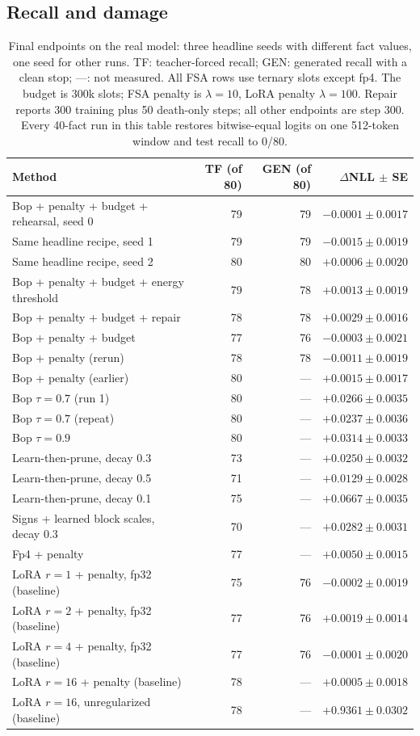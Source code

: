 \documentclass[11pt]{article}
\begin{document}
\subsection{Recall and damage}
\begin{table}[!ht]\centering\small
\setlength{\tabcolsep}{3pt}
\begin{tabular}{lrrr}\toprule
Method & TF (of 80) & GEN (of 80) & $\Delta$NLL $\pm$ SE\\\midrule
Bop + penalty + budget + rehearsal, seed 0 & 79 & 79 & $-0.0001\pm0.0017$\\
Same headline recipe, seed 1 & 79 & 79 & $-0.0015\pm0.0019$\\
Same headline recipe, seed 2 & 80 & 80 & $+0.0006\pm0.0020$\\
Bop + penalty + budget + energy threshold & 79 & 78 & $+0.0013\pm0.0019$\\
Bop + penalty + budget + repair & 78 & 78 & $+0.0029\pm0.0016$\\
Bop + penalty + budget & 77 & 76 & $-0.0003\pm0.0021$\\
Bop + penalty (rerun) & 78 & 78 & $-0.0011\pm0.0019$\\
Bop + penalty (earlier) & 80 & --- & $+0.0015\pm0.0017$\\
Bop $\tau=0.7$ (run 1) & 80 & --- & $+0.0266\pm0.0035$\\
Bop $\tau=0.7$ (repeat) & 80 & --- & $+0.0237\pm0.0036$\\
Bop $\tau=0.9$ & 80 & --- & $+0.0314\pm0.0033$\\
Learn-then-prune, decay 0.3 & 73 & --- & $+0.0250\pm0.0032$\\
Learn-then-prune, decay 0.5 & 71 & --- & $+0.0129\pm0.0028$\\
Learn-then-prune, decay 0.1 & 75 & --- & $+0.0667\pm0.0035$\\
Signs + learned block scales, decay 0.3 & 70 & --- & $+0.0282\pm0.0031$\\
Fp4 + penalty & 77 & --- & $+0.0050\pm0.0015$\\
LoRA $r=1$ + penalty, fp32 (baseline) & 75 & 76 & $-0.0002\pm0.0019$\\
LoRA $r=2$ + penalty, fp32 (baseline) & 77 & 76 & $+0.0019\pm0.0014$\\
LoRA $r=4$ + penalty, fp32 (baseline) & 77 & 76 & $-0.0001\pm0.0020$\\
LoRA $r=16$ + penalty (baseline) & 78 & --- & $+0.0005\pm0.0018$\\
LoRA $r=16$, unregularized (baseline) & 78 & --- & $+0.9361\pm0.0302$\\\bottomrule
\end{tabular}
\caption{Final endpoints on the real model: three headline seeds with different fact values, one seed for other runs. TF: teacher-forced recall; GEN: generated
recall with a clean stop; ---: not measured. All FSA rows use ternary slots except fp4.
The budget is 300k slots; FSA penalty is $\lambda=10$, LoRA penalty $\lambda=100$.
Repair reports 300 training plus 50 death-only steps; all other endpoints are step 300.
Every 40-fact run in this table restores bitwise-equal logits on one 512-token window and test recall to 0/80.}
\label{tab:real}
\end{table}
\end{document}

